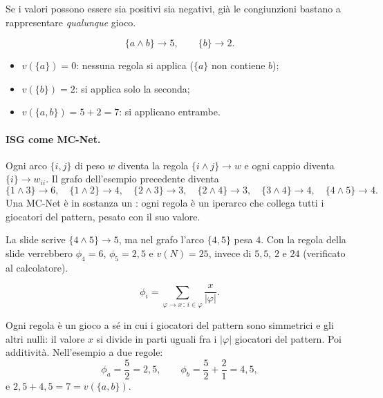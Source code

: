 Se i valori possono essere sia positivi sia negativi, già le congiunzioni bastano a
rappresentare \emph{qualunque} gioco.

\begin{esempio}
\[
  \{a \land b\} \to 5, \qquad \{b\} \to 2.
\]
\begin{itemize}
  \item $v(\{a\}) = 0$: nessuna regola si applica ($\{a\}$ non contiene $b$);
  \item $v(\{b\}) = 2$: si applica solo la seconda;
  \item $v(\{a, b\}) = 5 + 2 = 7$: si applicano entrambe.
\end{itemize}
\end{esempio}

\paragraph{ISG come MC-Net.}
Ogni arco $\{i,j\}$ di peso $w$ diventa la regola $\{i \land j\} \to w$ e ogni cappio
diventa $\{i\} \to w_{ii}$. Il grafo dell'esempio precedente diventa
\[
  \{1 \land 3\} \to 6,\quad \{1 \land 2\} \to 4,\quad \{2 \land 3\} \to 3,\quad
  \{2 \land 4\} \to 3,\quad \{3 \land 4\} \to 4,\quad \{4 \land 5\} \to 4.
\]
Una MC-Net è in sostanza un : ogni regola è un iperarco che collega tutti i
giocatori del pattern, pesato con il suo valore.

\begin{attenzione}
La slide scrive $\{4 \land 5\} \to 5$, ma nel grafo l'arco $\{4,5\}$ pesa $4$. Con la regola
della slide verrebbero $\phi_4 = 6$, $\phi_5 = 2{,}5$ e $v(N) = 25$, invece di $5{,}5$, $2$ e
$24$ (verificato al calcolatore).
\end{attenzione}

\begin{teorema}
\[
  \phi_i = \sum_{\varphi \to x \,:\, i \in \varphi} \frac{x}{|\varphi|}.
\]
\end{teorema}
Ogni regola è un gioco a sé in cui i giocatori del pattern sono simmetrici e gli altri
nulli: il valore $x$ si divide in parti uguali fra i $|\varphi|$ giocatori del pattern. Poi
additività. Nell'esempio a due regole:
\[
  \phi_a = \frac52 = 2{,}5, \qquad \phi_b = \frac52 + \frac21 = 4{,}5,
\]
e $2{,}5 + 4{,}5 = 7 = v(\{a,b\})$.


